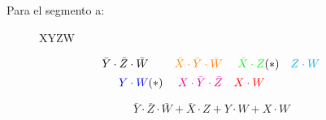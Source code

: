 Para el segmento a:
\begin{figure}[H]
  \centering
    \begin{Karnaugh}{X}{Y}{Z}{W}
    \end{Karnaugh}
\end{figure}

\begin{align*}
  \bar{Y} \cdot \bar{Z} \cdot \bar{W} & &
  \color{orange} \bar{X} \cdot \bar{Y} \cdot \bar{W}& &
  \color{green} \bar{X} \cdot Z & (*) &
  \color{cyan} Z \cdot W \\
  \color{blue} Y \cdot W & (*) &
  \color{magenta} X \cdot \bar{Y} \cdot \bar{Z} & &
  \color{red} X \cdot W &
  \color{black}
\end{align*}

\begin{equation*}
  \bar{Y} \cdot \bar{Z} \cdot \bar{W} +
  \bar{X} \cdot Z +
  Y \cdot W +
  X \cdot W
\end{equation*}
